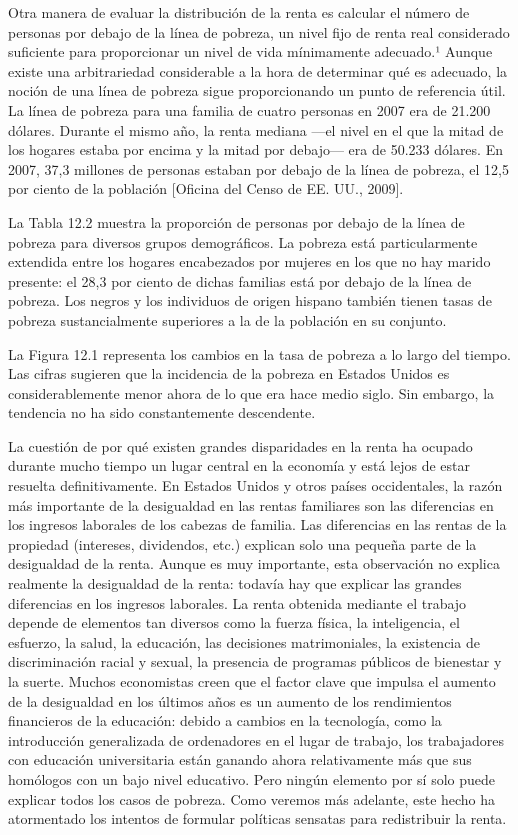 \documentclass[10pt,a4paper]{article}
\begin{document}
Otra manera de evaluar la distribución de la renta es calcular el número de personas por debajo de la línea de pobreza, un nivel fijo de renta real considerado suficiente para proporcionar un nivel de vida mínimamente adecuado.¹ Aunque existe una arbitrariedad considerable a la hora de determinar qué es adecuado, la noción de una línea de pobreza sigue proporcionando un punto de referencia útil. La línea de pobreza para una familia de cuatro personas en 2007 era de 21.200 dólares. Durante el mismo año, la renta mediana —el nivel en el que la mitad de los hogares estaba por encima y la mitad por debajo— era de 50.233 dólares. En 2007, 37,3 millones de personas estaban por debajo de la línea de pobreza, el 12,5 por ciento de la población [Oficina del Censo de EE. UU., 2009].

La Tabla 12.2 muestra la proporción de personas por debajo de la línea de pobreza para diversos grupos demográficos. La pobreza está particularmente extendida entre los hogares encabezados por mujeres en los que no hay marido presente: el 28,3 por ciento de dichas familias está por debajo de la línea de pobreza. Los negros y los individuos de origen hispano también tienen tasas de pobreza sustancialmente superiores a la de la población en su conjunto.

La Figura 12.1 representa los cambios en la tasa de pobreza a lo largo del tiempo. Las cifras sugieren que la incidencia de la pobreza en Estados Unidos es considerablemente menor ahora de lo que era hace medio siglo. Sin embargo, la tendencia no ha sido constantemente descendente.

La cuestión de por qué existen grandes disparidades en la renta ha ocupado durante mucho tiempo un lugar central en la economía y está lejos de estar resuelta definitivamente. En Estados Unidos y otros países occidentales, la razón más importante de la desigualdad en las rentas familiares son las diferencias en los ingresos laborales de los cabezas de familia. Las diferencias en las rentas de la propiedad (intereses, dividendos, etc.) explican solo una pequeña parte de la desigualdad de la renta. Aunque es muy importante, esta observación no explica realmente la desigualdad de la renta: todavía hay que explicar las grandes diferencias en los ingresos laborales. La renta obtenida mediante el trabajo depende de elementos tan diversos como la fuerza física, la inteligencia, el esfuerzo, la salud, la educación, las decisiones matrimoniales, la existencia de discriminación racial y sexual, la presencia de programas públicos de bienestar y la suerte. Muchos economistas creen que el factor clave que impulsa el aumento de la desigualdad en los últimos años es un aumento de los rendimientos financieros de la educación: debido a cambios en la tecnología, como la introducción generalizada de ordenadores en el lugar de trabajo, los trabajadores con educación universitaria están ganando ahora relativamente más que sus homólogos con un bajo nivel educativo. Pero ningún elemento por sí solo puede explicar todos los casos de pobreza. Como veremos más adelante, este hecho ha atormentado los intentos de formular políticas sensatas para redistribuir la renta.
\end{document}
